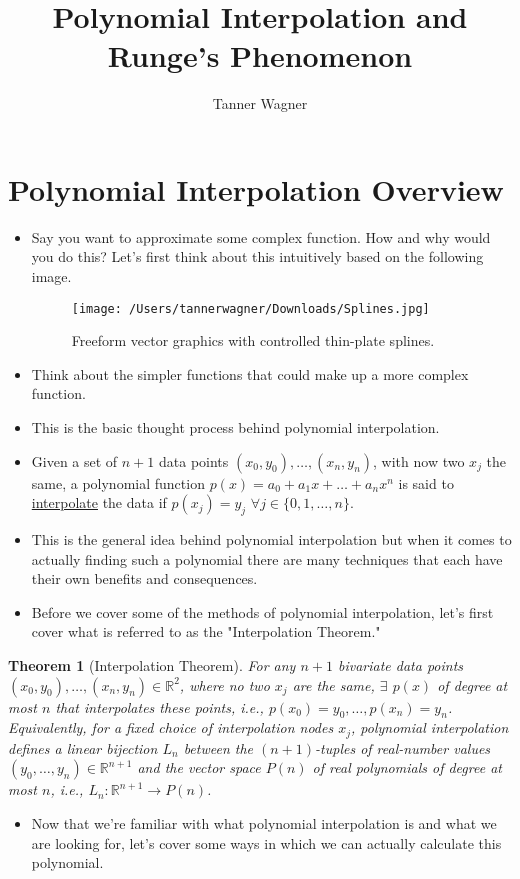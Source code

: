 \documentclass{article}
\title{Polynomial Interpolation and Runge's Phenomenon}
\author{Tanner Wagner}
\newtheorem{theorem}{Theorem}
\begin{document}
\maketitle

\section{Polynomial Interpolation \text{|} Overview}
\begin{itemize}
\item Say you want to approximate some complex function. How and why would you do this? Let's first think about this intuitively based on the following image.
\begin{figure}[H]
\centering
\texttt{[image: /Users/tannerwagner/Downloads/Splines.jpg]}
\caption[Short caption]{Freeform vector graphics with controlled thin-plate splines.}
\end{figure}
\item Think about the simpler functions that could make up a more complex function. 
\item This is the basic thought process behind polynomial interpolation.
\item Given a set of $n + 1$ data points $(x_0,y_0),\dots,(x_n,y_n)$, with now two $x_j$ the same, a polynomial function $p(x) = a_0+a_1x+\dots+a_nx^n$ is said to \underline{interpolate} the data if $p(x_j) = y_j$ $\forall j \in \{0,1,\ldots,n\}$.
\end{itemize}
\begin{itemize}
\item This is the general idea behind polynomial interpolation but when it comes to actually finding such a polynomial there are many techniques that each have their own benefits and consequences.
\item Before we cover some of the methods of polynomial interpolation, let's first cover what is referred to as the "Interpolation Theorem."
\end{itemize}
\begin{theorem}[Interpolation Theorem]
For any $n+1$ bivariate data points $(x_0,y_0),\dots,(x_n,y_n)\in\mathbb{R}^2$, where no two $x_j$ are the same, $\exists$ $p(x)$ of degree at most $n$ that interpolates these points, i.e., $p(x_0)=y_0,\dots,p(x_n)=y_n$. Equivalently, for a fixed choice of interpolation nodes $x_j$, polynomial interpolation defines a linear bijection $L_n$ between the $(n+1)$-tuples of real-number values $(y_0,\dots,y_n)\in\mathbb{R}^{n+1}$ and the vector space $P(n)$ of real polynomials of degree at most $n$, i.e., $L_n:\mathbb{R}^{n+1} \rightarrow P(n)$.
\end{theorem}
\begin{itemize}
\item Now that we're familiar with what polynomial interpolation is and what we are looking for, let's cover some ways in which we can actually calculate this polynomial.
\end{itemize}
\end{document}
